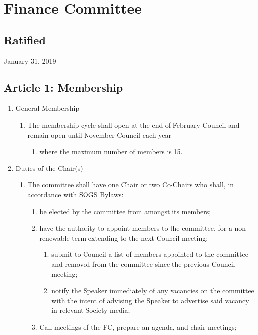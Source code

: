 \section{Finance Committee}

\subsection{Ratified}
January 31, 2019

\subsection{Article 1: Membership}
\begin{enumerate}[label*=\arabic*., align=left]	
\item General Membership
\begin{enumerate}[label*=\arabic*., align=left]	
	\item The membership cycle shall open at the end of February Council and remain open until November Council  each year, 
	\begin{enumerate}[label*=\arabic*., align=left]
		\item where the maximum number of members is 15.
		\end{enumerate}
	\end{enumerate}
\item Duties of the Chair(s)
\begin{enumerate}[label*=\arabic*., align=left]
	\item The committee shall have one Chair or two Co-Chairs who shall, in accordance with SOGS Bylaws:
	\begin{enumerate}[label*=\arabic*., align=left]
		\item be elected by the committee from amongst its members;
		\item have the authority to appoint members to the committee, for a non-renewable term extending to the next Council meeting;
		\begin{enumerate}[label*=\arabic*., align=left]
			\item submit to Council a list of members appointed to the committee and removed from the committee since the previous Council meeting;
			\item notify the Speaker immediately of any vacancies on the committee with the intent of advising the Speaker to advertise said vacancy in relevant Society media;
			\end{enumerate}
		\item Call meetings of the FC, prepare an agenda, and chair meetings;

\end{enumerate}
\end{enumerate}
\end{enumerate}
